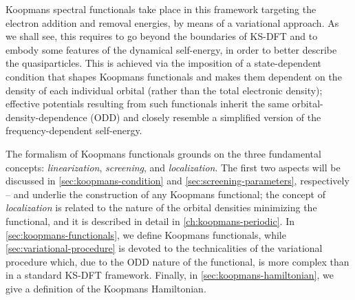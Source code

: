 Koopmans spectral functionals take place in this framework targeting the electron addition and removal energies, by means of a variational approach. As we shall see, this requires to go beyond the boundaries of KS-DFT and to embody some features of the dynamical self-energy, in order to better describe the quasiparticles. This is achieved via the imposition of a state-dependent condition that shapes Koopmans functionals and makes them dependent on the density of each individual orbital (rather than the total electronic density); effective potentials resulting from such functionals inherit the same orbital-density-dependence (ODD) and closely resemble a simplified version of the frequency-dependent self-energy.

The formalism of Koopmans functionals grounds on the three fundamental concepts: \emph{linearization}, \emph{screening}, and \emph{localization}. The first two aspects will be discussed in \cref{sec:koopmans-condition} and \cref{sec:screening-parameters}, respectively -- and underlie the construction of any Koopmans functional; the concept of \emph{localization} is related to the nature of the orbital densities minimizing the functional, and it is described in detail in \cref{ch:koopmans-periodic}. In \cref{sec:koopmans-functionals}, we define Koopmans functionals, while \cref{sec:variational-procedure} is devoted to the technicalities of the variational procedure which, due to the ODD nature of the functional, is more complex than in a standard KS-DFT framework. Finally, in \cref{sec:koopmans-hamiltonian}, we give a definition of the Koopmans Hamiltonian.

